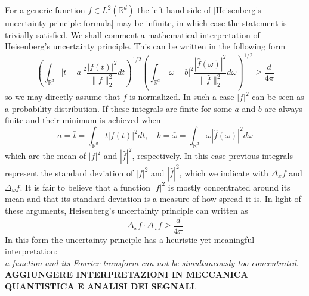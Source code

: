 \documentclass[corpo=11pt, stile=classica, tipotesi=custom,
greek, evenboxes, english]{toptesi}
\numberwithin{equation}{chapter}
\theoremstyle{remark}
\newcommand{\R}{\mathbb{R}} %
\begin{document}
For a generic function $f \in L^2(\R^d)$ the left-hand side of \eqref{Heisenberg's uncertainty principle formula} may be infinite, in which case the statement is trivially satisfied. {\color{blue}We shall comment a mathematical interpretation of Heisenberg's uncertainty principle. This can be written in the following form
\begin{equation*}
	\left(\int_{\R^d}|t-a|^2 \dfrac{|f(t)|^2}{\|f\|_2^2} dt\right)^{1/2} \left(\int_{\R^d} |\omega-b|^2 \dfrac{|\hat{f}(\omega)|^2}{\|\hat{f}\|_2^2}d\omega\right)^{1/2} \geq \dfrac{d}{4\pi}
\end{equation*}
so we may directly assume that $f$ is normalized. In such a case $|f|^2$ can be seen as a probability distribution. If these integrals are finite for some $a$ and $b$ are always finite and their minimum is achieved when
\begin{equation*}
	a = \bar{t} = \int_{\R^d} t |f(t)|^2 dt, \quad b = \bar{\omega} = \int_{\R^d} \omega |\hat{f}(\omega)|^2 d\omega
\end{equation*}
which are the mean of $|f|^2$ and $|\hat{f}|^2$, respectively. In this case previous integrals represent the standard deviation of $|f|^2$ and $|\hat{f}|^2$, which we indicate with $\Delta_x f$ and $\Delta_{\omega} f$. It is fair to believe that a function $|f|^2$ is mostly concentrated around its mean and that its standard deviation is a measure of how spread it is. In light of these arguments, Heisenberg's uncertainty principle can written as
\begin{equation*}
	\Delta_x f \cdot \Delta_{\omega} f \geq \dfrac{d}{4\pi}
\end{equation*}
In this form the uncertainty principle has a heuristic yet meaningful interpretation:\\
\emph{a function and its Fourier transform can not be simultaneously too concentrated}.\\
\textbf{AGGIUNGERE INTERPRETAZIONI IN MECCANICA QUANTISTICA E ANALISI DEI SEGNALI}.}
\end{document}
